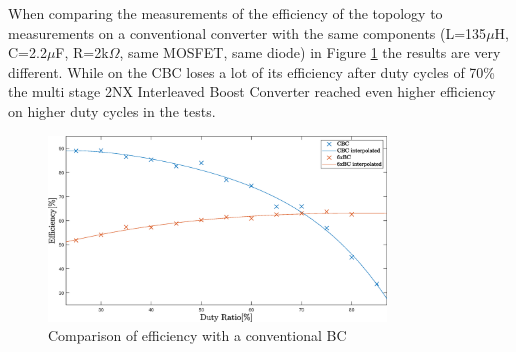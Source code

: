 When comparing the measurements of the efficiency of the topology to measurements on a conventional converter with the same components (L=135$\mu$H, C=2.2$\mu$F, R=2k$\Omega$, same MOSFET, same diode) in Figure \ref{fig:Efficiencycomparison} the results are very different.
While on the CBC loses a lot of its efficiency after duty cycles of 70\% the multi stage 2NX Interleaved Boost Converter reached even higher efficiency on higher duty cycles in the tests.

\begin{figure}[H]
	\begin{center}
   \includegraphics[width=0.8\textwidth]{figures/Efficiencycomparison.eps}
	\end{center}
	\vspace{-4mm}
	\caption{Comparison of efficiency with a conventional BC}
	\label{fig:Efficiencycomparison}
\end{figure}
